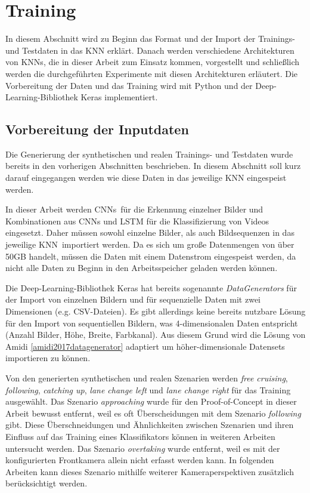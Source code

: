 \section{Training}
\label{umsetzung_training}

In diesem Abschnitt wird zu Beginn das Format und der Import der Trainings- und Testdaten in das \ac{KNN} erklärt. Danach werden verschiedene Architekturen von \acp{KNN}, die in dieser Arbeit zum Einsatz kommen, vorgestellt und schließlich werden die durchgeführten Experimente mit diesen Architekturen erläutert. Die Vorbereitung der Daten und das Training wird mit Python und der Deep-Learning-Bibliothek Keras \cite{chollet2015keras} implementiert.


\subsection{Vorbereitung der Inputdaten}
\label{umsetzung_training_input}

Die Generierung der synthetischen und realen Trainings- und Testdaten wurde bereits in den vorherigen Abschnitten beschrieben. In diesem Abschnitt soll kurz darauf eingegangen werden wie diese Daten in das jeweilige \ac{KNN} eingespeist werden.

In dieser Arbeit werden \acp{CNN} für die Erkennung einzelner Bilder und Kombinationen aus \acp{CNN} und \ac{LSTM} für die Klassifizierung von Videos eingesetzt. Daher müssen sowohl einzelne Bilder, als auch Bildsequenzen in das jeweilige \ac{KNN} importiert werden. Da es sich um große Datenmengen von über 50GB handelt, müssen die Daten mit einem Datenstrom eingespeist werden, da nicht alle Daten zu Beginn in den Arbeitsspeicher geladen werden können.

Die Deep-Learning-Bibliothek Keras hat bereits sogenannte \textit{DataGenerators} für der Import von einzelnen Bildern und für sequenzielle Daten mit zwei Dimensionen (e.g. CSV-Dateien). Es gibt allerdings keine bereits nutzbare Lösung für den Import von sequentiellen Bildern, was 4-dimensionalen Daten entspricht (Anzahl Bilder, Höhe, Breite, Farbkanal). Aus diesem Grund wird die Lösung von Amidi \ref{amidi2017datagenerator} adaptiert um höher-dimensionale Datensets importieren zu können.

Von den generierten synthetischen und realen Szenarien werden \textit{free cruising}, \textit{following}, \textit{catching up}, \textit{lane change left} und \textit{lane change right} für das Training ausgewählt. Das Szenario \textit{approaching} wurde für den Proof-of-Concept in dieser Arbeit bewusst entfernt, weil es oft Überscheidungen mit dem Szenario \textit{following} gibt. Diese Überschneidungen und Ähnlichkeiten zwischen Szenarien und ihren Einfluss auf das Training eines Klassifikators können in weiteren Arbeiten untersucht werden. Das Szenario \textit{overtaking} wurde entfernt, weil es mit der konfigurierten Frontkamera allein nicht erfasst werden kann. In folgenden Arbeiten kann dieses Szenario mithilfe weiterer Kameraperspektiven zusätzlich berücksichtigt werden.

